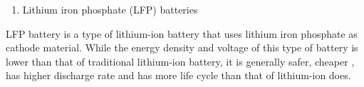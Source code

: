 \begin{enumerate}[resume]
    \item Lithium iron phosphate (LFP) batteries
\end{enumerate}
LFP battery is a type of lithium-ion battery that uses lithium iron phosphate as cathode material. While the energy density and voltage of this type of battery is lower than that of traditional lithium-ion battery, it is generally safer, cheaper , has higher discharge rate and has more life cycle than that of lithium-ion does.\cite{wiki:lfp_battery}\\ 